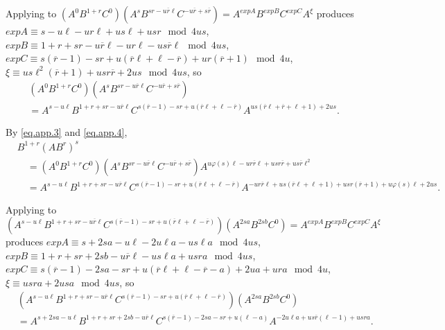 \documentclass{amsart}
\theoremstyle{definition}
\theoremstyle{remark}
\begin{document}
Applying \cite[Theorem 3.2]{MS3} to
$(A^0 B^{1+r} C^0) (A^s B^{sr - u\overline{r}\ell} C^{-u\overline{r} + s\overline{r}}) = A^{expA} B^{expB} C^{expC} A^{\xi}$ produces
$expA\equiv s - u\ell - ur\ell + us\ell + usr\mod 4us$,
$expB\equiv 1 + r + sr - u\overline{r}\ell - ur\ell - us\overline{r}\ell\mod 4us$,
$expC\equiv s(\overline{r} - 1) - sr + u(\overline{r}\ell + \ell - \overline{r}) + ur(\overline{r} + 1)\mod 4u$,
$\xi\equiv us\ell^2(\overline{r} + 1) + usr\overline{r} + 2us\mod 4us$, so
\begin{equation}\label{eq.app.4}
    \begin{split}
        &(A^0 B^{1+r} C^0) (A^s B^{sr - u\overline{r}\ell} C^{-u\overline{r} + s\overline{r}})\\
        &= A^{s - u\ell} B^{1 + r + sr - u\overline{r}\ell} C^{s(\overline{r} - 1) - sr + u(\overline{r}\ell + \ell - \overline{r})} A^{us(\overline{r}\ell + \overline{r} + \ell + 1) + 2us}.
    \end{split}
\end{equation}

By \eqref{eq.app.3} and \eqref{eq.app.4},
\begin{equation}\label{eq.app.5}
    \begin{split}
        &B^{1+r} (AB^r)^s\\
        &\quad = (A^0 B^{1+r} C^0) (A^s B^{sr - u\overline{r}\ell} C^{-u\overline{r} + s\overline{r}}) A^{u\varphi(s)\ell - ur\overline{r}\ell + usr\overline{r} + us\overline{r}\ell^2}\\
        &\quad = A^{s - u\ell} B^{1 + r + sr - u\overline{r}\ell} C^{s(\overline{r} - 1) - sr + u(\overline{r}\ell + \ell - \overline{r})} A^{-ur\overline{r}\ell + us(\overline{r}\ell + \ell + 1) + usr(\overline{r} + 1) + u\varphi(s)\ell + 2us}.
    \end{split}
\end{equation}

Applying \cite[Theorem 3.2]{MS3} to
\[
(A^{s - u\ell} B^{1 + r + sr - u\overline{r}\ell} C^{s(\overline{r} - 1) - sr + u(\overline{r}\ell + \ell - \overline{r})}) (A^{2sa} B^{2sb} C^0)
= A^{expA} B^{expB} C^{expC} A^{\xi}
\]
produces
$expA\equiv s + 2sa - u\ell - 2u\ell a - us\ell a\mod 4us$,
$expB\equiv 1 + r + sr + 2sb - u\overline{r}\ell - us\ell a + usra\mod 4us$,
$expC\equiv s(\overline{r} - 1) - 2sa - sr + u(\overline{r}\ell + \ell - \overline{r} - a) + 2ua + ura\mod 4u$,
$\xi\equiv usra + 2usa\mod 4us$, so
\begin{equation}\label{eq.app.6}
    \begin{split}
        &(A^{s - u\ell} B^{1 + r + sr - u\overline{r}\ell} C^{s(\overline{r} - 1) - sr + u(\overline{r}\ell + \ell - \overline{r})}) (A^{2sa} B^{2sb} C^0)\\
        &= A^{s + 2sa - u\ell} B^{1 + r + sr + 2sb - u\overline{r}\ell} C^{s(\overline{r} - 1) - 2sa - sr + u(\ell - a)} A^{-2u\ell a + us\overline{r}(\ell - 1) + usra}.
    \end{split}
\end{equation}
\end{document}
